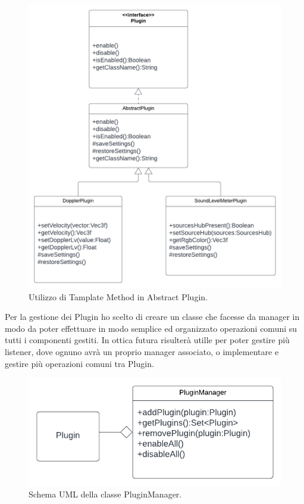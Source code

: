 \documentclass[a4paper,12pt]{report}
\begin{document}
\begin{figure}[H]
\centering{}
\includegraphics[width=\textwidth]{img/listener/Plugin.png}
\caption{Utilizzo di Tamplate Method in Abstract Plugin.}
\label{img:Listener}
\end{figure}
%
Per la gestione dei Plugin ho scelto di creare un classe che facesse da manager in modo da poter effettuare in modo semplice ed organizzato operazioni comuni su tutti i componenti gestiti. In ottica futura risulterà utille per poter gestire più listener, dove ognuno avrà un proprio manager associato, o implementare e  gestire più operazioni comuni tra Plugin.
\begin{figure}[H]
\centering{}
\includegraphics[width=\textwidth]{img/listener/PluginManager.png}
\caption{Schema UML della classe PluginManager.}
\label{img:Listener}
\end{figure}
\end{document}
